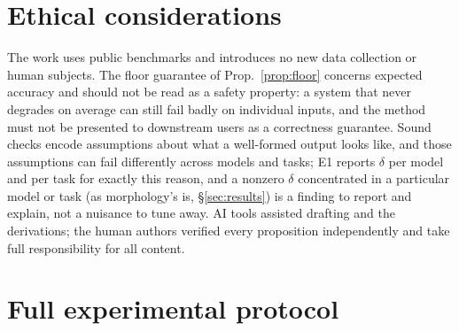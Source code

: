 \documentclass[11pt]{article}
\begin{document}
\section*{Ethical considerations}
The work uses public benchmarks and introduces no new data collection or human subjects. The floor guarantee of Prop.~\ref{prop:floor} concerns expected accuracy and should not be read as a safety property: a system that never degrades on average can still fail badly on individual inputs, and the method must not be presented to downstream users as a correctness guarantee. Sound checks encode assumptions about what a well-formed output looks like, and those assumptions can fail differently across models and tasks; E1 reports $\delta$ per model and per task for exactly this reason, and a nonzero $\delta$ concentrated in a particular model or task (as morphology's is, \S\ref{sec:results}) is a finding to report and explain, not a nuisance to tune away. AI tools assisted drafting and the derivations; the human authors verified every proposition independently and take full responsibility for all content.



\appendix

\section{Full experimental protocol}\label{app:protocol}
\end{document}
